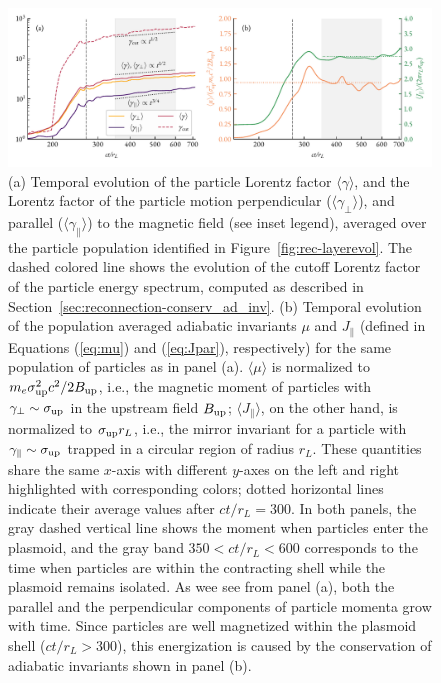 \begin{figure}[htb]
    \centering
    \includegraphics[width=\textwidth]{figures/ch2-reconnection/fig7.pdf}
    \caption{(a)
    Temporal evolution of the particle Lorentz factor $\langle\gamma\rangle$, and the Lorentz factor of the particle motion perpendicular ($\langle\gamma_\perp\rangle$), and parallel ($\langle\gamma_{\parallel}\rangle$) to the magnetic field (see inset legend), averaged over the particle population identified in Figure~\ref{fig:rec-layerevol}. The dashed colored line shows the evolution of the cutoff Lorentz factor of the particle energy spectrum, computed as described in Section~\ref{sec:reconnection-conserv_ad_inv}. (b) Temporal evolution of the population averaged adiabatic invariants $\mu$ and $J_\parallel$ (defined in Equations (\ref{eq:mu}) and (\ref{eq:Jpar}), respectively) for the same population of particles as in panel (a). $\langle\mu\rangle$ is normalized to $m_e \sigma_{\rm up}^2 c^2/2B_{\rm up}$, i.e., the magnetic moment of particles with $\gamma_\perp\sim \sigma_{\rm up}$ in the upstream field $B_{\rm up}$; $\langle J_\parallel\rangle$, on the other hand, is normalized to $\sigma_{\rm up} r_L$, i.e., the mirror invariant for a particle with $\gamma_\parallel\sim\sigma_{\rm up}$ trapped in a circular region of radius $r_L$. These quantities share the same $x$-axis with different $y$-axes on the left and right highlighted with corresponding colors; dotted horizontal lines indicate their average values after $ct/r_L=300$.
    In both panels, the gray dashed vertical line shows the moment when particles enter the plasmoid, and the gray band $350<ct/r_L<600$ corresponds to the time when particles are within the contracting shell while the plasmoid remains isolated. As wee see from panel (a), both the parallel and the perpendicular components of particle momenta grow with time. Since particles are well magnetized within the plasmoid shell ($ct/r_L>300$), this energization is caused by the conservation of adiabatic invariants shown in panel (b).}
    \label{fig:rec-layer_gam_mu}
\end{figure}

